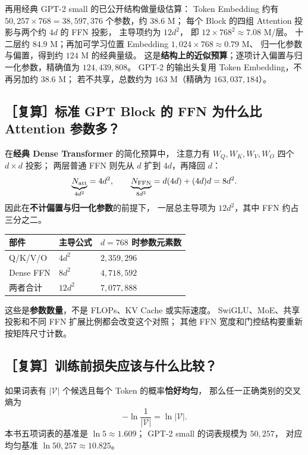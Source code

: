 再用经典 GPT-2 small 的已公开结构做量级估算：
Token Embedding 约有
$50{,}257\times768=38{,}597{,}376$ 个参数，约 $38.6$ M；
每个 Block 的四组 Attention 投影与两个约 $4d$ 的 FFN 投影，
主导项约为 $12d^2$，
即 $12\times768^2\approx7.08$ M/层。
十二层约 $84.9$ M；再加可学习位置 Embedding
$1{,}024\times768\approx0.79$ M、
归一化参数与偏置，得到约 $124$ M 的经典量级。
这是\textbf{结构上的近似预算}；逐项计入偏置与归一化参数，精确值为 $124{,}439{,}808$。
GPT-2 的输出头复用 Token Embedding，不再另加约 $38.6$ M；
若不共享，总数约为 $163$ M（精确为 $163{,}037{,}184$）。

\subsection{［复算］标准 GPT Block 的 FFN 为什么比 Attention 参数多？}

在\textbf{经典 Dense Transformer} 的简化预算中，
注意力有 $W_Q,W_K,W_V,W_O$ 四个 $d\times d$ 投影；
两层普通 FFN 则先从 $d$ 扩到 $4d$，再降回 $d$：
\[
\underbrace{N_{\rm att}}_{4d^2}=4d^2,\qquad
\underbrace{N_{\rm FFN}}_{8d^2}=d(4d)+(4d)d=8d^2.
\]
因此在\textbf{不计偏置与归一化参数}的前提下，
一层总主导项为 $12d^2$，其中 FFN 约占三分之二。

\begin{center}\small
{}
\begin{tabularx}{\linewidth}{@{}p{24mm}p{28mm}X@{}}
\toprule
部件 & 主导公式 & $d=768$ 时参数元素数\\\midrule
Q/K/V/O & $4d^2$ & $2{,}359{,}296$\\
Dense FFN & $8d^2$ & $4{,}718{,}592$\\
两者合计 & $12d^2$ & $7{,}077{,}888$\\
\bottomrule
\end{tabularx}
\end{center}
这些是\textbf{参数数量}，不是 FLOPs、KV Cache 或实际速度。
SwiGLU、MoE、共享投影和不同 FFN 扩展比例都会改变这个对照；
其他 FFN 宽度和门控结构要重新按矩阵尺寸计数。


\subsection{［复算］训练前损失应该与什么比较？}

如果词表有 $|\mathcal V|$ 个候选且每个 Token 的概率\textbf{恰好均匀}，
那么任一正确类别的交叉熵为
\[
-\ln\frac1{|\mathcal V|}=\ln|\mathcal V|.
\]
本书五项词表的基准是
$\ln5\approx\boxed{1.609}$；
GPT-2 small 的词表规模为 $50{,}257$，
对应均匀基准 $\ln 50{,}257\approx\boxed{10.825}$。

